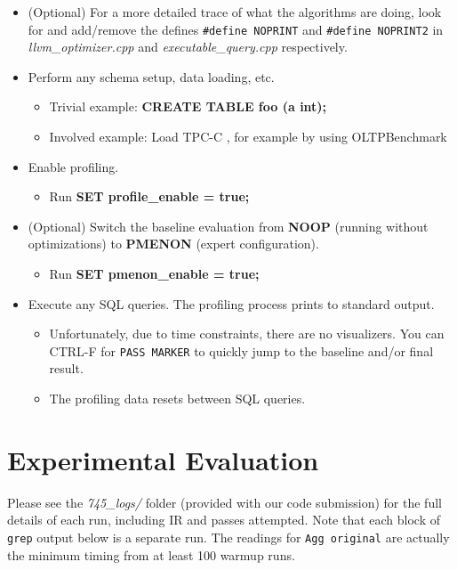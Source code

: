 \documentclass{vldb}
\newcommand{\dbCode}[1]{{\sffamily\small \textbf{#1}}\xspace}
\begin{document}
\begin{itemize}
    \item (Optional) For a more detailed trace of what the algorithms are doing, look for and add/remove the defines \lstinline{#define NOPRINT} and \lstinline{#define NOPRINT2} in \textit{llvm\_optimizer.cpp} and \textit{executable\_query.cpp} respectively.
    \item Perform any schema setup, data loading, etc.
    \begin{itemize}
        \item Trivial example: \dbCode{CREATE TABLE foo (a int);}
        \item Involved example: Load TPC-C \cite{tpcc}, for example by using OLTPBenchmark \cite{oltpbench}
    \end{itemize}
    \item Enable profiling.
    \begin{itemize}
        \item Run \dbCode{SET profile\_enable = true;}
    \end{itemize}
    \item (Optional) Switch the baseline evaluation from \dbCode{NOOP} (running without optimizations) to \dbCode{PMENON} (expert configuration).
    \begin{itemize}
        \item Run \dbCode{SET pmenon\_enable = true;}
    \end{itemize}
    \item Execute any SQL queries. The profiling process prints to standard output.
    \begin{itemize}
        \item Unfortunately, due to time constraints, there are no visualizers. You can CTRL-F for \lstinline{PASS MARKER} to quickly jump to the baseline and/or final result.
        \item The profiling data resets between SQL queries.
    \end{itemize}
\end{itemize}


\section{Experimental Evaluation}

Please see the \textit{745\_logs/} folder (provided with our code submission) for the full details of each run, including IR and passes attempted. Note that each block of \lstinline{grep} output below is a separate run. The readings for \lstinline{Agg original} are actually the minimum timing from at least 100 warmup runs.
\end{document}
